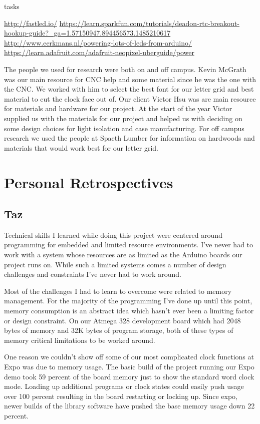 tasks\documentclass[onecolumn, draftclsnofoot,10pt, compsoc]{IEEEtran}
\begin{document}
\url{http://fastled.io/}
\url{https://learn.sparkfun.com/tutorials/deadon-rtc-breakout-hookup-guide?_ga=1.57150947.894456573.1485210617}
\url{http://www.eerkmans.nl/powering-lots-of-leds-from-arduino/}
\url{https://learn.adafruit.com/adafruit-neopixel-uberguide/power}


The people we used for research were both on and off campus.
Kevin McGrath was our main resource for CNC help and some material since he was the one with the CNC.
We worked with him to select the best font for our letter grid and best material to cut the clock face out of.
Our client Victor Hsu was are main resource for materials and hardware for our project.
At the start of the year Victor supplied us with the materials for our project and helped us with deciding on some design choices for light isolation and case manufacturing.
For off campus research we used the people at Spaeth Lumber for information on hardwoods and materials that would work best for our letter grid.

\section{Personal Retrospectives}
\subsection{Taz}
Technical skills I learned while doing this project were centered around programming for embedded and limited resource environments.
I’ve never had to work with a system whose resources are as limited as the Arduino boards our project runs on.
While such a limited systems comes a number of design challenges and constraints I’ve never had to work around.

Most of the challenges I had to learn to overcome were related to memory management.
For the majority of the programming I’ve done up until this point, memory consumption is an abstract idea which hasn’t ever been a limiting factor or design constraint.
On our Atmega 328 development board which had 2048 bytes of memory and 32K bytes of program storage, both of these types of memory critical limitations to be worked around.

One reason we couldn’t show off some of our most complicated clock functions at Expo was due to memory usage.
The basic build of the project running our Expo demo took 59 percent of the board memory just to show the standard word clock mode.
Loading up additional programs or clock states could easily push usage over 100 percent resulting in the board restarting or locking up.
Since expo, newer builds of the library software have pushed the base memory usage down 22 percent.
\end{document}
